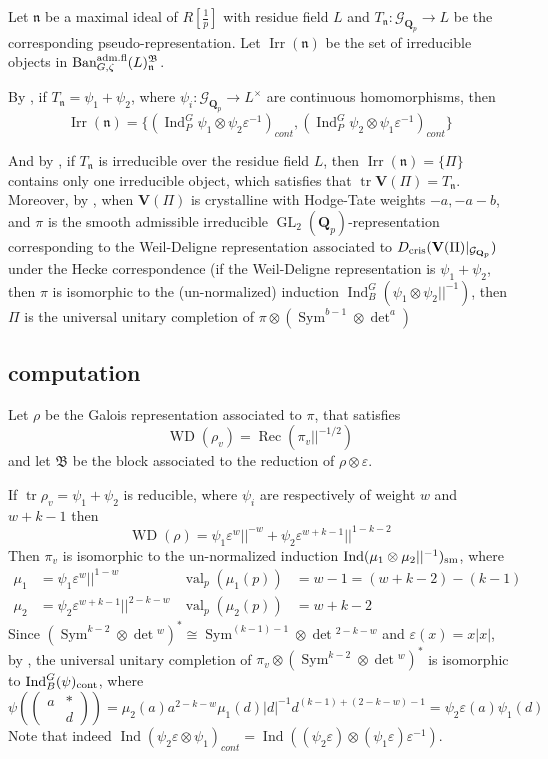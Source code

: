 \documentclass[leqno]{amsart}
\newcommand{\smat}[1]{\left( \begin{smallmatrix} #1 \end{smallmatrix} \right)}
\newcommand{\Gp}{\mathcal{G}_{\Qp}} %
\newcommand{\Ban}{\textnormal{Ban}^{\textnormal{adm.fl}}}
\DeclareMathOperator{\Irr}{Irr}
\DeclareMathOperator{\WD}{WD}
\newcommand{\cris}{\textnormal{cris}}
\newcommand{\cont}{\textnormal{cont}}
\newcommand{\sm}{\textnormal{sm}}
\DeclareMathOperator{\GL}{GL}
\DeclareMathOperator{\mtr}{tr}
\DeclareMathOperator{\Sym}{Sym}
\DeclareMathOperator{\val}{val}
\newcommand{\Qp}{\mathbf{Q}_p}
\newcommand{\1}{\mathbf{1}}
\newcommand{\B}{\mathfrak B}
\newcommand{\fn}{\mathfrak n}
\DeclareMathOperator{\Ind}{Ind}
\DeclareMathOperator{\Rec}{Rec}
\theoremstyle{definition}
\theoremstyle{remark}
\begin{document}
Let $\fn$ be a maximal ideal of  $R[\frac{1}{p}]$
with residue field  $L$ and 
$T_\fn\colon \Gp\to L$ 
be the corresponding pseudo-representation.
Let  $\Irr(\fn)$
be the set of irreducible objects in  $\Ban_{G,\zeta}(L)^\B_{\fn}$.

By \cite[Cor 8.15]{pask}, 
if $T_\fn=\psi_1+\psi_2$,
where  $\psi_i\colon \Gp\to L^\times$
are continuous homomorphisms, then  
\begin{equation}\label{eq:comple1}
	\Irr(\fn)=\{(\Ind_P^G\psi_1\otimes\psi_2\varepsilon^{-1})_{cont},
	(\Ind_P^G\psi_2\otimes\psi_1\varepsilon^{-1})_{cont}\}
\end{equation}

And by \cite[Cor 8.14]{pask}, 
if $T_\fn$ is irreducible over the residue field $L$, 
then $\Irr(\fn)=\{\Pi\}$ contains only one irreducible object,
which satisfies that $\mtr\mathbf{V}(\Pi)=T_\fn$.
Moreover, by \cite[Thm. 1.3]{CDP},
when $\mathbf{V}(\Pi)$ is crystalline with Hodge-Tate weights $-a,-a-b$,
and $\pi$ is the smooth admissible irreducible
$\GL_2(\Qp)$-representation
corresponding to the Weil-Deligne representation
associated to  $D_{\cris}(\mathbf{V}(\Pi)\vert_{\Gp})$
under the Hecke correspondence
(if the Weil-Deligne representation is $\psi_1+\psi_2$,
then $\pi$ is isomorphic to 
the (un-normalized) induction $\Ind_B^G(\psi_1\otimes\psi_2||^{-1})$,
then $\Pi$ is the universal unitary completion
of  $\pi\otimes(\Sym^{b-1}\otimes \det^a)$


\subsection{computation}

Let $\rho$ be the Galois representation
associated to  $\pi$, that satisfies
\[
	\WD(\rho_v)=\Rec(\pi_v||^{-1/2})
\]
and let $\B$ be the block associated to the reduction
of  $\rho\otimes\varepsilon$.

If $\mtr\rho_v=\psi_1+\psi_2$ is reducible,
where $\psi_i$ are respectively of weight
$w$ and  $w+k-1$
then 
\[
	\WD(\rho)=\psi_1\varepsilon^w||^{-w}+
	\psi_2\varepsilon^{w+k-1}||^{1-k-2}
\]
Then $\pi_v$ is isomorphic to the un-normalized induction
$\Ind(\mu_1\otimes\mu_2||^{-1})_{\sm}$, where
\begin{align*}
	\mu_1&=\psi_1\varepsilon^{w}||^{1-w} &
	\val_p(\mu_1(p))&=w-1=(w+k-2)-(k-1)\\
	\mu_2&=\psi_2\varepsilon^{w+k-1}||^{2-k-w} &
	\val_p(\mu_2(p))&=w+k-2
\end{align*}
Since $(\Sym^{k-2}\otimes\det{}^w)^*\cong \Sym^{(k-1)-1}\otimes\det{}^{2-k-w}$
and $\varepsilon(x)=x|x|$,
by \cite[Thm 12.3]{pask}, 
the universal unitary completion
of $\pi_v\otimes(\Sym^{k-2}\otimes\det{}^w)^*$
is isomorphic to $\Ind_B^G(\psi)_{\cont}$, where
\[
	\psi(\smat{a&*\\&d})=\mu_2(a)a^{2-k-w}\mu_1(d)|d|^{-1}d^{(k-1)+(2-k-w)-1}
	=\psi_2\varepsilon(a)\psi_1(d)
\]
Note that indeed 
$\Ind(\psi_2\varepsilon\otimes\psi_1)_{cont}=
\Ind((\psi_2\varepsilon)\otimes(\psi_1\varepsilon)\varepsilon^{-1})$.
\end{document}
